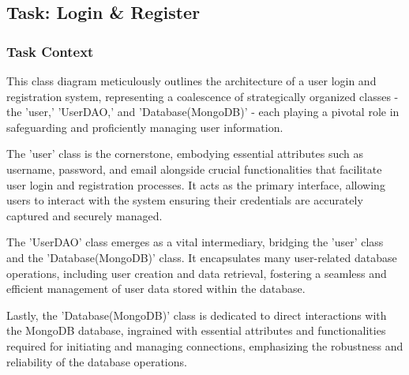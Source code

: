 \documentclass[conference]{IEEEtran}
\begin{document}
\subsection{\textbf{Task: Login \& Register }}

\subsubsection{\textbf{Task Context }}
\textbf{}

This class diagram meticulously outlines the architecture of a user login and registration system, representing a coalescence of strategically organized classes - the 'user,' 'UserDAO,' and 'Database(MongoDB)' - each playing a pivotal role in safeguarding and proficiently managing user information.

The 'user' class is the cornerstone, embodying essential attributes such as username, password, and email alongside crucial functionalities that facilitate user login and registration processes. It acts as the primary interface, allowing users to interact with the system ensuring their credentials are accurately captured and securely managed.

The 'UserDAO' class emerges as a vital intermediary, bridging the 'user' class and the 'Database(MongoDB)' class. It encapsulates many user-related database operations, including user creation and data retrieval, fostering a seamless and efficient management of user data stored within the database.

Lastly, the 'Database(MongoDB)' class is dedicated to direct interactions with the MongoDB database, ingrained with essential attributes and functionalities required for initiating and managing connections, emphasizing the robustness and reliability of the database operations.
\end{document}
